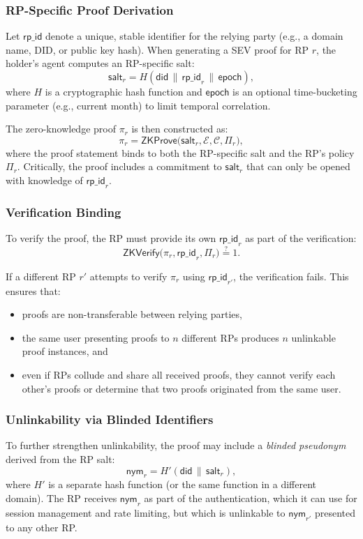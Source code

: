 \documentclass[11pt]{article}
\begin{document}
\subsubsection{RP-Specific Proof Derivation}

Let $\mathsf{rp\_id}$ denote a unique, stable identifier for the relying party (e.g., a domain name, DID, or public key hash). When generating a SEV proof for RP $r$, the holder's agent computes an RP-specific salt:
\[
  \mathsf{salt}_r = H(\mathsf{did} \,\|\, \mathsf{rp\_id}_r \,\|\, \mathsf{epoch}),
\]
where $H$ is a cryptographic hash function and $\mathsf{epoch}$ is an optional time-bucketing parameter (e.g., current month) to limit temporal correlation.

The zero-knowledge proof $\pi_r$ is then constructed as:
\[
  \pi_r = \textsf{ZKProve}\big( \mathsf{salt}_r, \mathcal{E}, \mathcal{C}, \Pi_r \big),
\]
where the proof statement binds to both the RP-specific salt and the RP's policy $\Pi_r$. Critically, the proof includes a commitment to $\mathsf{salt}_r$ that can only be opened with knowledge of $\mathsf{rp\_id}_r$.

\subsubsection{Verification Binding}

To verify the proof, the RP must provide its own $\mathsf{rp\_id}_r$ as part of the verification:
\[
  \textsf{ZKVerify}\big( \pi_r, \mathsf{rp\_id}_r, \Pi_r \big) \stackrel{?}{=} 1.
\]

If a different RP $r'$ attempts to verify $\pi_r$ using $\mathsf{rp\_id}_{r'}$, the verification fails. This ensures that:
\begin{itemize}
  \item proofs are non-transferable between relying parties,
  \item the same user presenting proofs to $n$ different RPs produces $n$ unlinkable proof instances, and
  \item even if RPs collude and share all received proofs, they cannot verify each other's proofs or determine that two proofs originated from the same user.
\end{itemize}

\subsubsection{Unlinkability via Blinded Identifiers}

To further strengthen unlinkability, the proof may include a \emph{blinded pseudonym} derived from the RP salt:
\[
  \mathsf{nym}_r = H'(\mathsf{did} \,\|\, \mathsf{salt}_r),
\]
where $H'$ is a separate hash function (or the same function in a different domain). The RP receives $\mathsf{nym}_r$ as part of the authentication, which it can use for session management and rate limiting, but which is unlinkable to $\mathsf{nym}_{r'}$ presented to any other RP.
\end{document}
